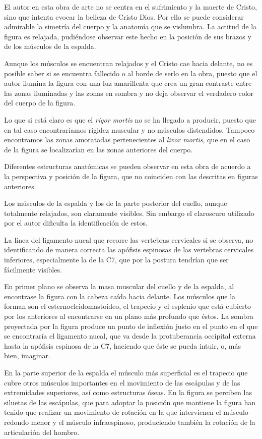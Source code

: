 El autor en esta obra de arte no se centra en el sufrimiento y la muerte de Cristo, sino que intenta evocar la belleza de Cristo Dios. Por ello se puede considerar admirable la simetría del cuerpo y la anatomía que se vislumbra. La actitud de la figura es relajada, pudiéndose observar este hecho en la posición de sus brazos y de los músculos de la espalda.

Aunque los músculos se encuentran relajados y el Cristo cae hacia delante, no es posible saber si se encuentra fallecido o al borde de serlo en la obra, puesto que el autor ilumina la figura con una luz amarillenta que crea un gran contraste entre las zonas iluminadas y las zonas en sombra y no deja observar el verdadero color del cuerpo de la figura.

Lo que si está claro es que el \textit{rigor mortis} no se ha llegado a producir, puesto que en tal caso encontraríamos rigidez muscular y no músculos distendidos. Tampoco encontramos las zonas amoratadas pertenecientes al \textit{livor mortis}, que en el caso de la figura se localizarían en las zonas anteriores del cuerpo.

Diferentes estructuras anatómicas se pueden observar en esta obra de acuerdo a la perspectiva y posición de la figura, que no coinciden con las descritas en figuras anteriores.

Los músculos de la espalda y los de la parte posterior del cuello, aunque totalmente relajados, son claramente visibles. Sin embargo el claroscuro utilizado por el autor dificulta la identificación de estos.

La línea del ligamento nucal que recorre las vertebras cervicales si se observa, no identificando de manera correcta las apófisis espinosas de las vertebras cervicales inferiores, especialmente la de la C7, que por la postura tendrían que ser fácilmente visibles. 

En primer plano se observa la masa muscular del cuello y de la espalda, al encontrase la figura con la cabeza caída hacia delante. Los músculos que la forman son el esternocleidomastoideo, el trapecio y el esplenio que está cubierto por los anteriores al encontrarse en un plano más profundo que éstos. La sombra proyectada por la figura produce un punto de inflexión justo en el punto en el que se encontraría el ligamento nucal, que va desde la protuberancia occipital externa hasta la apófisis espinosa de la C7, haciendo que éste se pueda intuir, o, más bien, imaginar.

En la parte superior de la espalda el músculo más superficial es el trapecio que cubre otros músculos importantes en el movimiento de las escápulas y de las extremidades superiores, así como estructuras óseas. En la figura se perciben las siluetas de las escápulas, que para adoptar la posición que mantiene la figura han tenido que realizar un movimiento de rotación en la que intervienen el músculo redondo menor y el músculo infraespinoso, produciendo también la rotación de la articulación del hombro.

